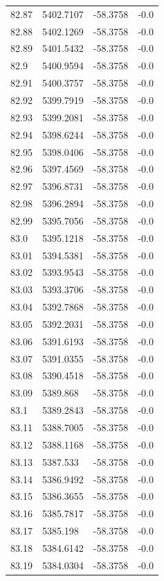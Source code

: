\begin{table}[H]
\begin{tabular}{llll}
82.87 & 5402.7107 & -58.3758 & -0.0 \\
82.88 & 5402.1269 & -58.3758 & -0.0 \\
82.89 & 5401.5432 & -58.3758 & -0.0 \\
82.9 & 5400.9594 & -58.3758 & -0.0 \\
82.91 & 5400.3757 & -58.3758 & -0.0 \\
82.92 & 5399.7919 & -58.3758 & -0.0 \\
82.93 & 5399.2081 & -58.3758 & -0.0 \\
82.94 & 5398.6244 & -58.3758 & -0.0 \\
82.95 & 5398.0406 & -58.3758 & -0.0 \\
82.96 & 5397.4569 & -58.3758 & -0.0 \\
82.97 & 5396.8731 & -58.3758 & -0.0 \\
82.98 & 5396.2894 & -58.3758 & -0.0 \\
82.99 & 5395.7056 & -58.3758 & -0.0 \\
83.0 & 5395.1218 & -58.3758 & -0.0 \\
83.01 & 5394.5381 & -58.3758 & -0.0 \\
83.02 & 5393.9543 & -58.3758 & -0.0 \\
83.03 & 5393.3706 & -58.3758 & -0.0 \\
83.04 & 5392.7868 & -58.3758 & -0.0 \\
83.05 & 5392.2031 & -58.3758 & -0.0 \\
83.06 & 5391.6193 & -58.3758 & -0.0 \\
83.07 & 5391.0355 & -58.3758 & -0.0 \\
83.08 & 5390.4518 & -58.3758 & -0.0 \\
83.09 & 5389.868 & -58.3758 & -0.0 \\
83.1 & 5389.2843 & -58.3758 & -0.0 \\
83.11 & 5388.7005 & -58.3758 & -0.0 \\
83.12 & 5388.1168 & -58.3758 & -0.0 \\
83.13 & 5387.533 & -58.3758 & -0.0 \\
83.14 & 5386.9492 & -58.3758 & -0.0 \\
83.15 & 5386.3655 & -58.3758 & -0.0 \\
83.16 & 5385.7817 & -58.3758 & -0.0 \\
83.17 & 5385.198 & -58.3758 & -0.0 \\
83.18 & 5384.6142 & -58.3758 & -0.0 \\
83.19 & 5384.0304 & -58.3758 & -0.0 \\

\end{tabular}
\end{table}
